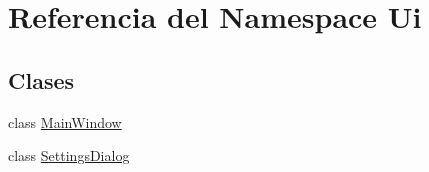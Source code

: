 \hypertarget{namespace_ui}{}\section{Referencia del Namespace Ui}
\label{namespace_ui}
\subsection*{Clases}
\begin{DoxyCompactItemize}
\item 
class \hyperlink{class_ui_1_1_main_window}{Main\+Window}
\item 
class \hyperlink{class_ui_1_1_settings_dialog}{Settings\+Dialog}
\end{DoxyCompactItemize}
